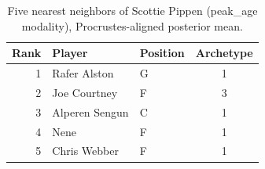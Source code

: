 \begin{table}[htbp]
  \centering\small
  \begin{tabular}{rllc}
    \toprule
    Rank & Player & Position & Archetype \\
    \midrule
    1 & Rafer Alston & G & 1 \\
    2 & Joe Courtney & F & 3 \\
    3 & Alperen Sengun & C & 1 \\
    4 & Nene & F & 1 \\
    5 & Chris Webber & F & 1 \\
    \bottomrule
  \end{tabular}
  \caption{Five nearest neighbors of Scottie Pippen (peak_age modality), Procrustes-aligned posterior mean.}
  \label{tab:Scottie_Pippen_neighbors_peak_age}
\end{table}

